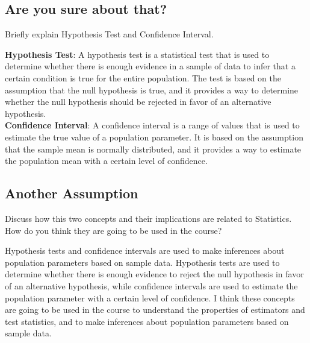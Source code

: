 \subsection{Are you sure about that?}
Briefly explain Hypothesis Test and Confidence Interval.
\begin{qsolve}
	\begin{qsolve}[]
		\textbf{Hypothesis Test}: A hypothesis test is a statistical test that is used to determine whether there is enough evidence in a sample of data to infer that a certain condition is true for the entire population. The test is based on the assumption that the null hypothesis is true, and it provides a way to determine whether the null hypothesis should be rejected in favor of an alternative hypothesis. \\
		\textbf{Confidence Interval}: A confidence interval is a range of values that is used to estimate the true value of a population parameter. It is based on the assumption that the sample mean is normally distributed, and it provides a way to estimate the population mean with a certain level of confidence. 
	\end{qsolve}
\end{qsolve}
\subsection{Another Assumption}
Discuss how this two concepts and their implications are related to Statistics. How do you
think they are going to be used in the course?
\begin{qsolve}
	\begin{qsolve}[]
		Hypothesis tests and confidence intervals are used to make inferences about population parameters based on sample data. Hypothesis tests are used to determine whether there is enough evidence to reject the null hypothesis in favor of an alternative hypothesis, while confidence intervals are used to estimate the population parameter with a certain level of confidence. I think these concepts are going to be used in the course to understand the properties of estimators and test statistics, and to make inferences about population parameters based on sample data. 
	\end{qsolve}
\end{qsolve}
